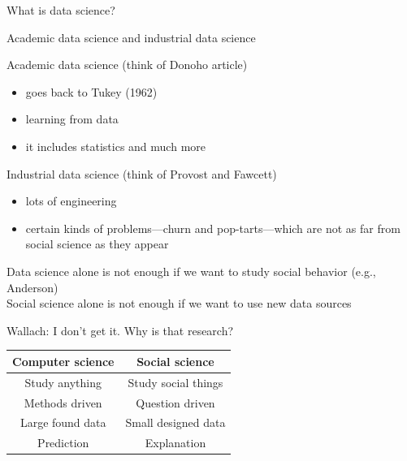 \documentclass{beamer}
\def\vf{\vfill}
\begin{document}
\begin{frame}

\begin{center}
\LARGE{What is data science?}
\end{center}
Academic data science and industrial data science

\end{frame}
\begin{frame}

Academic data science (think of Donoho article)\\
\begin{itemize}
\item goes back to Tukey (1962)
\pause
\item learning from data
\pause
\item it includes statistics and much more
\end{itemize}

\end{frame}
\begin{frame}

Industrial data science (think of Provost and Fawcett)
\begin{itemize}
\item lots of engineering
\pause
\item certain kinds of problems---churn and pop-tarts---which are not as far from social science as they appear
\end{itemize}

\end{frame}
\begin{frame}

Data science alone is not enough if we want to study social behavior (e.g., Anderson)\\
\pause
Social science alone is not enough if we want to use new data sources

\end{frame}
\begin{frame}

Wallach: I don't get it.  Why is that research? \\
\pause
\vf
\begin{tabular}{cc}
Computer science & Social science\\
\midrule
Study anything & Study social things\\
Methods driven & Question driven\\
Large found data & Small designed data\\
Prediction & Explanation\\
\end{tabular}

\end{frame}
\end{document}
